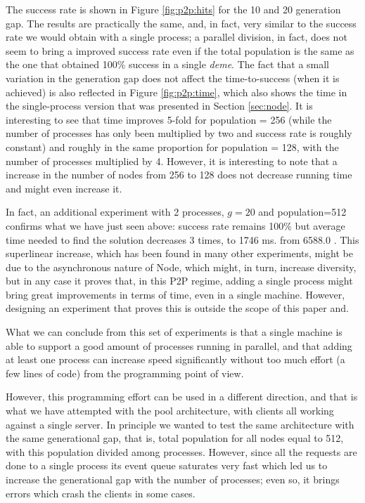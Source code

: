 \documentclass{sig-alternate}
\begin{document}
The success rate is shown in Figure \ref{fig:p2p:hits} for the 10 and
20 generation gap. The results are practically the same, and, in fact,
very similar to the success rate we would obtain with a single process; a
parallel division, in fact, does not seem to bring a improved success
rate even if the total population is the same as the one that obtained
100\% success in a single {\em deme}. The fact that a small variation
in the generation gap does not affect the time-to-success (when it is
achieved) is also reflected in Figure \ref{fig:p2p:time}, which also
shows the time in the single-process version that was presented in
Section \ref{sec:node}. It is interesting to see that time improves
5-fold for population = 256 (while the number of processes has only been
multiplied by two and success rate is roughly constant)  and roughly
in the same proportion for population = 128, with the number of
processes multiplied by 4. However, it is interesting to note that a
increase in the number of nodes from 256 to 128 does not decrease
running time and might even increase it. 

In fact, an additional experiment with 2 processes, $g=20$ and
population=512 confirms  what we have just seen above: success rate
remains 100\% but average time needed to find the solution decreases 3
times, to  1746 ms. from  6588.0 . This superlinear increase, which
has been found in many other experiments, might be due to the
asynchronous nature of Node, which might, in turn, increase
diversity, but in any case it proves that, in this P2P regime, adding
a single process might bring great improvements in terms of time, even in
a single machine. However, designing an experiment that proves this is
outside the scope of this paper and.

What we can conclude from this set of experiments is that a single
machine is able to support a good amount of processes running in
parallel, and that adding at least one process can increase speed
significantly without too much effort (a few lines of code) from the  programming point of view. 

However, this programming effort can be used in a different direction,
and that is what we have attempted with the pool architecture,
 with
clients all working against a single server. In principle we wanted to
test the same architecture with the same generational gap, that is,
total population for all nodes equal to 512, with this population
divided among processes. However, since all the requests are done to a
single process its event queue saturates very fast which led us to
increase the generational gap with the number of processes; even so, it
brings errors which crash the clients in some cases.
\end{document}
